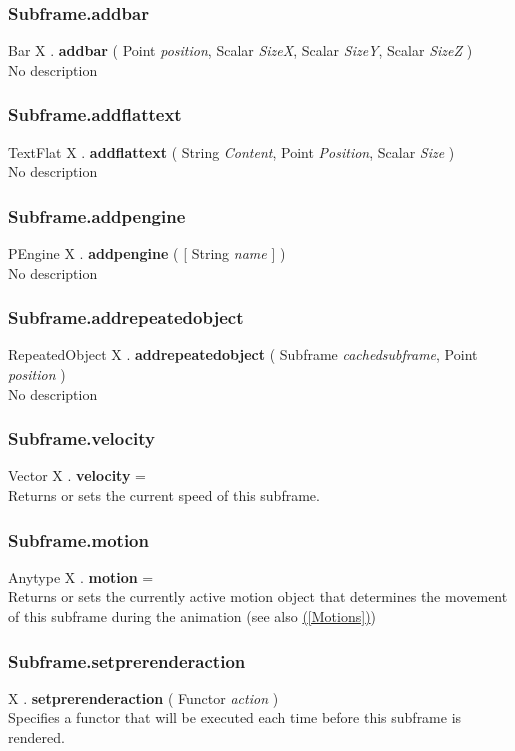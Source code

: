 \documentclass[10pt]{book}
\newcommand{\linkitem}[1]{\hyperref[#1]{\nameref{#1} (\ref{#1})}}
\begin{document}
\subsubsection{Subframe.addbar \label{F:Subframe:addbar}}
Bar X . \textbf{addbar} ( Point \textit{position}, Scalar \textit{SizeX}, Scalar \textit{SizeY}, Scalar \textit{SizeZ} ) \\
No description

\subsubsection{Subframe.addflattext \label{F:Subframe:addflattext}}
TextFlat X . \textbf{addflattext} ( String \textit{Content}, Point \textit{Position}, Scalar \textit{Size} ) \\
No description

\subsubsection{Subframe.addpengine \label{F:Subframe:addpengine}}
PEngine X . \textbf{addpengine} (  [ String \textit{name} ] ) \\
No description

\subsubsection{Subframe.addrepeatedobject \label{F:Subframe:addrepeatedobject}}
RepeatedObject X . \textbf{addrepeatedobject} ( Subframe \textit{cachedsubframe}, Point \textit{position} ) \\
No description

\subsubsection{Subframe.velocity \label{F:Subframe:velocity}}
Vector X . \textbf{velocity} = \\
Returns or sets the current speed of this subframe.

\subsubsection{Subframe.motion \label{F:Subframe:motion}}
Anytype X . \textbf{motion} = \\
Returns or sets the currently active motion object that determines the movement of this subframe during the animation (see also \linkitem{Motions})

\subsubsection{Subframe.setprerenderaction \label{F:Subframe:setprerenderaction}}
X . \textbf{setprerenderaction} ( Functor \textit{action} ) \\
Specifies a functor that will be executed each time before this subframe is rendered.
\end{document}
